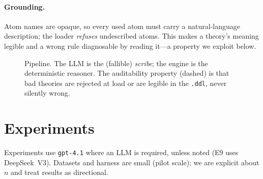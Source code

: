 \documentclass[11pt]{article}
\begin{document}
\paragraph{Grounding.} Atom names are opaque, so every used atom must carry a
natural-language description; the loader \emph{refuses} undescribed atoms. This
makes a theory's meaning legible and a wrong rule diagnosable by reading it---a
property we exploit below.

\begin{figure}[h]\centering
{}
\caption{Pipeline. The LLM is the (fallible) \emph{scribe}; the engine is the
deterministic reasoner. The auditability property (dashed) is that bad theories are
rejected at load or are legible in the \texttt{.ddl}, never silently wrong.}
\label{fig:pipeline}
\end{figure}

\section{Experiments}
Experiments use \texttt{gpt-4.1} where an LLM is required, unless noted (E9 uses
DeepSeek~V3). Datasets and harness are small (pilot scale); we are explicit about
$n$ and treat results as directional.
\end{document}
